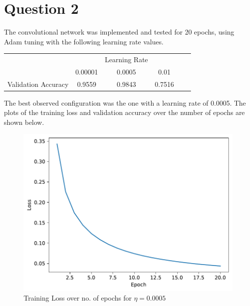     \section*{Question 2}

    \begin{questions}
        \question %
       
        \question %

        \question %

        \question
        The convolutional network was implemented and tested for 20 epochs, using Adam tuning with the following learning rate values.
        
        \begin{table}[h!]
            \centering
            \begin{tabular}{c|ccccc}
                &                                     & Learning Rate                      &                 &  &  \\ \cline{2-4}
                & \multicolumn{1}{c|}{0.00001}          & \multicolumn{1}{c|}{0.0005}          & 0.01             &  &  \\ \cline{1-4}
                Validation Accuracy & \multicolumn{1}{c|}{0.9559} & \multicolumn{1}{c|}{0.9843} & 0.7516 &  & 
            \end{tabular}
        \end{table}
    
        The best observed configuration was the one with a learning rate of 0.0005.
        The plots of the training loss and validation accuracy over the number of epochs are shown below.

        \begin{figure}[H]
            \centering
            \includegraphics[scale=0.6]{CNN-training-loss-0.0005-0.3-0-adam.pdf}
            \caption{Training Loss over no. of epochs for $\eta = 0.0005$}
            \label{}
        \end{figure}


\end{questions}
